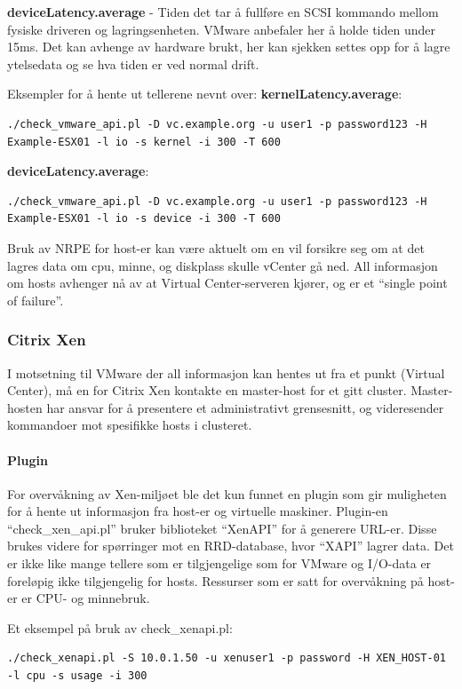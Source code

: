 {\bf deviceLatency.average} - Tiden det tar å fullføre en SCSI kommando mellom fysiske driveren og lagringsenheten. VMware anbefaler her å holde tiden under 15ms. Det kan avhenge av hardware brukt, her kan sjekken settes opp for å lagre ytelsedata og se hva tiden er ved normal drift.

Eksempler for å hente ut tellerene nevnt over:
{\bf kernelLatency.average}: 

\begin{lstlisting}
./check_vmware_api.pl -D vc.example.org -u user1 -p password123 -H Example-ESX01 -l io -s kernel -i 300 -T 600
\end{lstlisting}

{\bf deviceLatency.average}:
\begin{lstlisting}
./check_vmware_api.pl -D vc.example.org -u user1 -p password123 -H Example-ESX01 -l io -s device -i 300 -T 600
\end{lstlisting}

Bruk av NRPE for host-er kan være aktuelt om en vil forsikre seg om at det lagres data om cpu, minne, og diskplass skulle vCenter gå ned. All informasjon om hosts avhenger nå av at Virtual Center-serveren kjører, og er et ``single point of failure''.

\subsubsection{Citrix Xen}
I motsetning til VMware der all informasjon kan hentes ut fra et punkt (Virtual Center), må en for Citrix Xen  kontakte en master-host for et gitt cluster. Master-hosten har ansvar for å presentere et administrativt grensesnitt, og videresender kommandoer mot spesifikke hosts i clusteret.

\paragraph{Plugin}
For overvåkning av Xen-miljøet ble det kun funnet en plugin som gir muligheten for å hente ut informasjon fra host-er og virtuelle maskiner. Plugin-en ``check\_xen\_api.pl'' bruker biblioteket ``XenAPI'' for å generere URL-er. Disse brukes videre for spørringer mot en RRD-database, hvor ``XAPI'' lagrer data\cite{xenwiki}. Det er ikke like mange tellere som er tilgjengelige som for VMware og I/O-data er foreløpig ikke tilgjengelig for hosts. Ressurser som er satt for overvåkning på host-er er CPU- og minnebruk.

Et eksempel på bruk av check\_xenapi.pl: 
\begin{lstlisting}[style=example]
./check_xenapi.pl -S 10.0.1.50 -u xenuser1 -p password -H XEN_HOST-01 -l cpu -s usage -i 300
\end{lstlisting}

